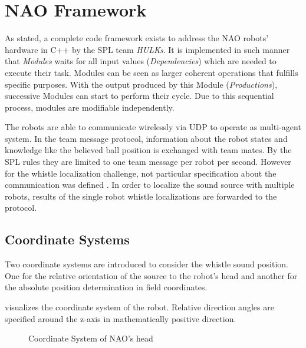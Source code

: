 \section{NAO Framework}
\label{sec:03_naoFramework}

As stated, a complete code framework exists to address the NAO robots' hardware
in C++ by the \ac{SPL} team \textit{HULKs}.
It is implemented in such manner that \textit{Modules} waits for all input
values (\textit{Dependencies}) which are needed to execute their task.
Modules can be seen as larger coherent operations that fulfills specific purposes.
With the output produced by this Module (\textit{Productions}), successive
Modules can start to perform their cycle.
Due to this sequential process, modules are modifiable independently.

The robots are able to communicate wirelessly via \ac{UDP} to operate as
multi-agent system.
In the team message protocol, information about the robot states and
knowledge like the believed ball position is exchanged with team mates.
By the \ac{SPL} rules \cite{rules} they are limited to one team message per
robot per second.
However for the whistle localization challenge, not particular specification
about the communication was defined \cite{technical_challenge}.
In order to localize the sound source with multiple robots, results of the
single robot whistle localizations are forwarded to the protocol.

\subsection{Coordinate Systems}
\label{subsec:03_coordinates}

Two coordinate systems are introduced to consider the whistle sound position.
One for the relative orientation of the source to the robot's head and another
for the absolute position determination in field coordinates.

 visualizes the coordinate system of the
robot.
Relative direction angles are specified around the z-axis in
mathematically positive direction.
\begin{figure}[ht]
	\centering
	\caption{Coordinate System of NAO's head}
	\label{fig:03_naoCoordinates}
\end{figure}

